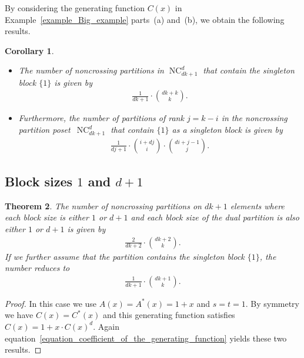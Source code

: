 \documentclass[11pt]{amsart}
\newtheorem{theorem}{Theorem}[section]
\newtheorem{corollary}[theorem]{Corollary}
\numberwithin{equation}{section}
\newcommand{\binomial}[2]{\binom{#1}{#2}}
\DeclareMathOperator{\NC}{NC}
\begin{document}
By considering the generating function $C(x)$ in
Example~\ref{example_Big_example} parts~(a) and~(b),
we obtain the following results.
\begin{corollary}
\begin{itemize}
\item[(a)]
The number of noncrossing partitions in $\NC^{d}_{dk+1}$
that contain the singleton block $\{1\}$ is given by
\begin{align*}
\frac{1}{dk+1} \cdot \binom{dk+k}{k} .
\end{align*}
\item[(b)]
Furthermore, the number of partitions of rank $j=k-i$
in the noncrossing partition poset~$\NC^{d}_{dk+1}$
that contain $\{1\}$ as a singleton block
is given by
\begin{align*}
\frac{1}{dj+1}
\cdot
\binomial{i+dj}{i}
\cdot
\binomial{di+j-1}{j} .
\end{align*}
\end{itemize}
\end{corollary}



\subsection{Block sizes $1$ and $d+1$}
\label{subsection_Cardinality}




\begin{theorem}
\label{theorem_smallblocks}
The number of noncrossing partitions on $dk+1$ elements where
each block size is either $1$ or $d+1$
and
each block size of the dual partition is also either $1$ or $d+1$
is given by
\begin{align*}
\frac{2}{dk+2} \cdot \binom{dk+2}{k} .
\end{align*}
If we further assume that the partition contains
the singleton block $\{1\}$, the number reduces to
\begin{align*}
\frac{1}{dk+1} \cdot \binom{dk+1}{k} .
\end{align*}
\end{theorem}
\begin{proof}
In this case we use $A(x) = A^{*}(x) = 1 + x$ and $s = t = 1$.
By symmetry we have $C(x) = C^{*}(x)$
and this generating function satisfies
$C(x) = 1 + x \cdot C(x)^{d}$.
Again equation~\eqref{equation_coefficient_of_the_generating_function}
yields these two results.
\end{proof}
\end{document}
